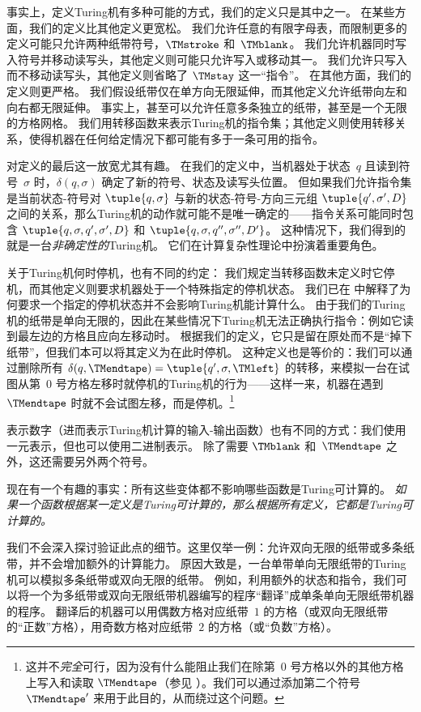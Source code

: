 \documentclass[../../../include/open-logic-section]{subfiles}
\begin{document}

事实上，定义Turing机有多种可能的方式，我们的定义只是其中之一。
在某些方面，我们的定义比其他定义更宽松。
我们允许任意的有限字母表，而限制更多的定义可能只允许两种纸带符号，$\TMstroke$
和~$\TMblank$。
我们允许机器同时写入符号并移动读写头，其他定义则可能只允许写入或移动其一。
我们允许只写入而不移动读写头，其他定义则省略了 $\TMstay$ 这一“指令”。
在其他方面，我们的定义则更严格。
我们假设纸带仅在单方向无限延伸，而其他定义允许纸带向左和向右都无限延伸。
事实上，甚至可以允许任意多条独立的纸带，甚至是一个无限的方格网格。
我们用转移函数来表示Turing机的指令集；其他定义则使用转移关系，使得机器在任何给定情况下都可能有多于一条可用的指令。

对定义的最后这一放宽尤其有趣。
在我们的定义中，当机器处于状态~$q$ 且读到符号~$\sigma$ 时，$\delta(q, \sigma)$ 确定了新的符号、状态及读写头位置。
但如果我们允许指令集是当前状态-符号对 $\tuple{q, \sigma}$ 与新的状态-符号-方向三元组 $\tuple{q', \sigma', D}$ 之间的关系，那么Turing机的动作就可能不是唯一确定的——指令关系可能同时包含 $\tuple{q,
  \sigma, q', \sigma', D}$ 和 $\tuple{q, \sigma, q'', \sigma'', D'}$。
这种情况下，我们得到的就是一台\emph{非确定性的}Turing机。
它们在计算复杂性理论中扮演着重要角色。

关于Turing机何时停机，也有不同的约定：
我们规定当转移函数未定义时它停机，而其他定义则要求机器处于一个特殊指定的停机状态。
我们已在  中解释了为何要求一个指定的停机状态并不会影响Turing机能计算什么。
由于我们的Turing机的纸带是单向无限的，因此在某些情况下Turing机无法正确执行指令：例如它读到最左边的方格且应向左移动时。
根据我们的定义，它只是留在原处而不是“掉下纸带”，但我们本可以将其定义为在此时停机。
这种定义也是等价的：我们可以通过删除所有 $\delta(q,\TMendtape) =
\tuple{q',\sigma,\TMleft}$ 的转移，来模拟一台在试图从第~$0$ 号方格左移时就停机的Turing机的行为——这样一来，机器在遇到~$\TMendtape$ 时就不会试图左移，而是停机。\footnote{这并不\emph{完全}可行，因为没有什么能阻止我们在除第~$0$ 号方格以外的其他方格上写入和读取 $\TMendtape$（参见 ）。我们可以通过添加第二个符号~$\TMendtape'$ 来用于此目的，从而绕过这个问题。}

表示数字（进而表示Turing机计算的输入-输出函数）也有不同的方式：我们使用一元表示，但也可以使用二进制表示。
除了需要 $\TMblank$ 和~$\TMendtape$ 之外，这还需要另外两个符号。

现在有一个有趣的事实：所有这些变体都不影响哪些函数是Turing可计算的。
\emph{如果一个函数根据某一定义是Turing可计算的，那么根据所有定义，它都是Turing可计算的。}

我们不会深入探讨验证此点的细节。这里仅举一例：允许双向无限的纸带或多条纸带，并不会增加额外的计算能力。
原因大致是，一台单带单向无限纸带的Turing机可以模拟多条纸带或双向无限的纸带。
例如，利用额外的状态和指令，我们可以将一个为多纸带或双向无限纸带机器编写的程序“翻译”成单条单向无限纸带机器的程序。
翻译后的机器可以用偶数方格对应纸带~$1$ 的方格（或双向无限纸带的“正数”方格），用奇数方格对应纸带~$2$ 的方格（或“负数”方格）。
\end{document}
